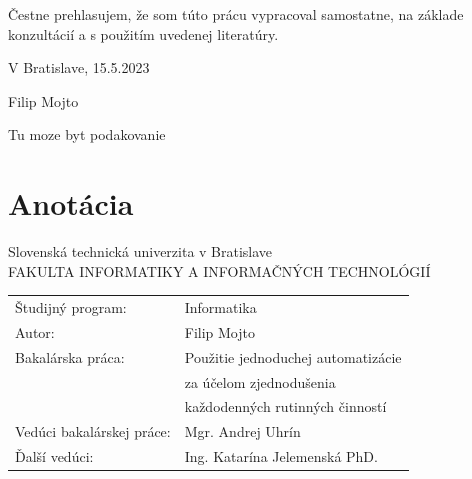 \documentclass[twoside,slovak, a4paper]{article}
\newcommand\blankpage{
    \null
    \thispagestyle{empty}
    \addtocounter{page}{1}
    \newpage}
\begin{document}
\blankpage

\blankpage

\null
\vfill

\noindent
Čestne prehlasujem, že som túto prácu vypracoval samostatne, na základe konzultácií a s použitím uvedenej literatúry.

\vspace*{0.8cm}

\noindent
V Bratislave, 15.5.2023

\vspace*{0cm}

\begin{flushright}

Filip Mojto \hspace*{1cm}

\vspace*{-0.5cm}

\end{flushright}

\newpage

\blankpage

Tu moze byt podakovanie

\blankpage

\blankpage

\section*{Anotácia}

\vspace*{0.3cm}

Slovenská technická univerzita v Bratislave\\

\noindent
FAKULTA INFORMATIKY A INFORMAČNÝCH TECHNOLÓGIÍ\\[0.2em]

\noindent
\begin{tabular}{@{}ll}
Študijný program: \hspace{11em} & Informatika \\[3em]
Autor: \hspace{11em} & Filip Mojto \\[0.7em]
Bakalárska práca: \hspace{11em} & Použitie jednoduchej automatizácie \\
 \hspace{11em} & za účelom zjednodušenia \\
 \hspace{11em} & každodenných rutinných činností\\[0.7em]
Vedúci bakalárskej práce: \hspace{11em} & Mgr. Andrej Uhrín\\[0.7em]
Ďalší vedúci: \hspace{11em} & Ing. Katarína Jelemenská PhD.\\[1.7em]

\end{tabular}
\end{document}
